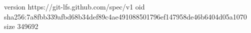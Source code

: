 version https://git-lfs.github.com/spec/v1
oid sha256:7a8fbb339afbd68b34def89c4ae491088501796ef147958de46b6404d05a1070
size 349692
